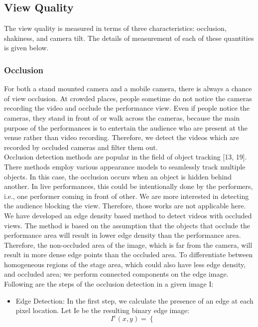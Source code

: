 \documentclass{sig-alternate}
\begin{document}
{{{\subsection{View Quality}
The view quality is measured in terms of three characteristics:
occlusion, shakiness, and camera tilt. The details of measurement
of each of these quantities is given below.
\subsubsection{Occlusion}
For both a stand mounted camera and a mobile camera, there
is always a chance of view occlusion. At crowded places, people
sometime do not notice the cameras recording the video and occlude
the performance view. Even if people notice the cameras,
they stand in front of or walk across the cameras, because the main
purpose of the performances is to entertain the audience who are
present at the venue rather than video recording. Therefore, we detect
the videos which are recorded by occluded cameras and filter
them out.\\
Occlusion detection methods are popular in the field of object
tracking [13, 19]. There methods employ various appearance models
to seamlessly track multiple objects. In this case, the occlusion
occurs when an object is hidden behind another. In live performances,
this could be intentionally done by the performers, i.e.,
one performer coming in front of other. We are more interested in
detecting the audience blocking the view. Therefore, those works
are not applicable here.\\
We have developed an edge density based method to detect videos
with occluded views. The method is based on the assumption that
the objects that occlude the performance area will result in lower
edge density than the performance area. Therefore, the non-occluded
area of the image, which is far from the camera, will result in more
dense edge points than the occluded area. To differentiate between
homogeneous regions of the stage area, which could also have less 
edge density, and occluded area; we perform connected components
on the edge image. Following are the steps of the occlusion
detection in a given image I:
\begin{itemize}
    \item Edge Detection: In the first step, we calculate the presence of
an edge at each pixel location. Let Ie be the resulting binary
edge image:
\begin{displaymath}
I^e(x,y) = \left\{
        \begin{array}{ll}

\end{array}
\end{displaymath}
\end{itemize}}}}
\end{document}
